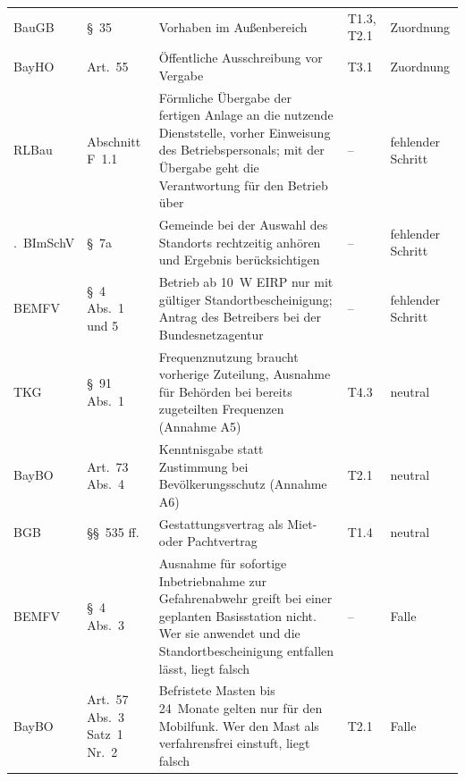 \begin{small}
\begin{longtable}{@{}>{\raggedright\arraybackslash}p{1.9cm}>{\raggedright\arraybackslash}p{2.4cm}>{\raggedright\arraybackslash}p{5.5cm}>{\raggedright\arraybackslash}p{2.4cm}>{\raggedright\arraybackslash}p{2.0cm}@{}}
BauGB & §~35 & Vorhaben im Außenbereich & T1.3, T2.1 & Zuordnung \\
BayHO & Art.~55 & Öffentliche Ausschreibung vor Vergabe & T3.1 & Zuordnung \\
RLBau & Abschnitt F~1.1 & Förmliche Übergabe der fertigen Anlage an die nutzende Dienststelle, vorher Einweisung des Betriebspersonals; mit der Übergabe geht die Verantwortung für den Betrieb über & -- & fehlender Schritt \\
26.~BImSchV & §~7a & Gemeinde bei der Auswahl des Standorts rechtzeitig anhören und Ergebnis berücksichtigen & -- & fehlender Schritt \\
BEMFV & §~4 Abs.~1 und 5 & Betrieb ab 10~W EIRP nur mit gültiger Standortbescheinigung; Antrag des Betreibers bei der Bundesnetzagentur & -- & fehlender Schritt \\
TKG & §~91 Abs.~1 & Frequenznutzung braucht vorherige Zuteilung, Ausnahme für Behörden bei bereits zugeteilten Frequenzen (Annahme A5) & T4.3 & neutral \\
BayBO & Art.~73 Abs.~4 & Kenntnisgabe statt Zustimmung bei Bevölkerungsschutz (Annahme A6) & T2.1 & neutral \\
BGB & §§~535 ff. & Gestattungsvertrag als Miet- oder Pachtvertrag & T1.4 & neutral \\
BEMFV & §~4 Abs.~3 & Ausnahme für sofortige Inbetriebnahme zur Gefahrenabwehr greift bei einer geplanten Basisstation nicht. Wer sie anwendet und die Standortbescheinigung entfallen lässt, liegt falsch & -- & Falle \\
BayBO & Art.~57 Abs.~3 Satz~1 Nr.~2 & Befristete Masten bis 24~Monate gelten nur für den Mobilfunk. Wer den Mast als verfahrensfrei einstuft, liegt falsch & T2.1 & Falle \\
\end{longtable}
\end{small}
